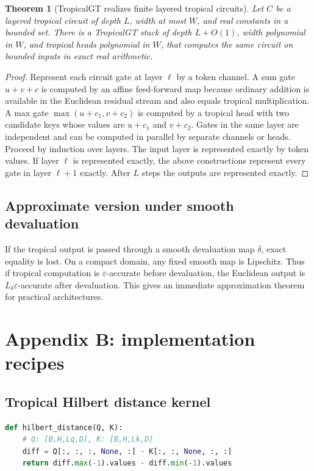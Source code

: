 \documentclass[11pt]{article}
\newtheorem{theorem}[definition]{Theorem}
\newcommand{\eps}{\varepsilon}
\begin{document}
\begin{theorem}[TropicalGT realizes finite layered tropical circuits]
Let \(C\) be a layered tropical circuit of depth \(L\), width at most \(W\), and real constants in a bounded set.  There is a TropicalGT stack of depth \(L+O(1)\), width polynomial in \(W\), and tropical heads polynomial in \(W\), that computes the same circuit on bounded inputs in exact real arithmetic.
\end{theorem}
\begin{proof}
Represent each circuit gate at layer \(\ell\) by a token channel.  A sum gate \(u+v+c\) is computed by an affine feed-forward map because ordinary addition is available in the Euclidean residual stream and also equals tropical multiplication.  A max gate \(\max(u+c_1,v+c_2)\) is computed by a tropical head with two candidate keys whose values are \(u+c_1\) and \(v+c_2\).  Gates in the same layer are independent and can be computed in parallel by separate channels or heads.  Proceed by induction over layers.  The input layer is represented exactly by token values.  If layer \(\ell\) is represented exactly, the above constructions represent every gate in layer \(\ell+1\) exactly.  After \(L\) steps the outputs are represented exactly.
\end{proof}

\subsection{Approximate version under smooth devaluation}

If the tropical output is passed through a smooth devaluation map \(\delta\), exact equality is lost.  On a compact domain, any fixed smooth map is Lipschitz.  Thus if tropical computation is \(\eps\)-accurate before devaluation, the Euclidean output is \(L_\delta\eps\)-accurate after devaluation.  This gives an immediate approximation theorem for practical architectures.

\section{Appendix B: implementation recipes}

\subsection{Tropical Hilbert distance kernel}

\begin{lstlisting}[language=Python]
def hilbert_distance(Q, K):
    # Q: [B,H,Lq,D], K: [B,H,Lk,D]
    diff = Q[:, :, :, None, :] - K[:, :, None, :, :]
    return diff.max(-1).values - diff.min(-1).values
\end{lstlisting}
\end{document}
